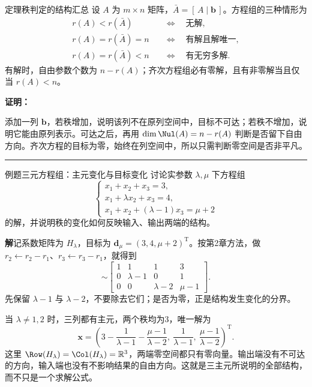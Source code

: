 \documentclass[a4paper,12pt,twoside,openany,fontset=none]{ctexbook}
\newcounter{theorem}[chapter]
\newenvironment{theorem}[1][]{\begin{thmBox}{定理}{#1}}{\end{thmBox}}
\newcounter{example}[chapter]
\newenvironment{example}[1][]{\begin{exBox}{例题}{#1}}{\end{exBox}}
\renewenvironment{proof}{
    \par\vspace{0.5em}\noindent
    \textbf{\color{LogicColor} 证明：}
}{
    \hfill \textcolor{LogicColor}{\rule{0.6em}{0.6em}} \par
}
\numberwithin{equation}{chapter}
\begin{document}
\begin{theorem}[秩判定的结构汇总]
设 $A$ 为 $m\times n$ 矩阵，$\bar A=[\,A\mid\boldsymbol b\,]$。方程组的三种情形为
\begin{align}
 r(A)<r(\bar A)&\quad\Longleftrightarrow\quad\text{无解},\\
 r(A)=r(\bar A)=n&\quad\Longleftrightarrow\quad\text{有解且解唯一},\\
 r(A)=r(\bar A)<n&\quad\Longleftrightarrow\quad\text{有无穷多解}.
\end{align}
有解时，自由参数个数为 $n-r(A)$；齐次方程组必有零解，且有非零解当且仅当 $r(A)<n$。
\end{theorem}
\begin{proof}
添加一列 $\boldsymbol b$，若秩增加，说明该列不在原列空间中，目标不可达；若秩不增加，说明它能由原列表示。可达之后，再用 $\dim\Nul(A)=n-r(A)$ 判断是否留下自由方向。齐次方程的目标为零，始终在列空间中，所以只需判断零空间是否非平凡。
\end{proof}

\begin{example}[三元方程组：主元变化与目标变化]
讨论实参数 $\lambda,\mu$ 下方程组
\begin{equation}
 \begin{cases}
 x_1+x_2+x_3=3,\\
 x_1+\lambda x_2+x_3=4,\\
 x_1+x_2+(\lambda-1)x_3=\mu+2
 \end{cases}
 \label{eq:five-two-parameter-system}
\end{equation}
的解，并说明秩的变化如何反映输入、输出两端的结构。
\end{example}
\textbf{解}\quad 记系数矩阵为 $H_\lambda$，目标为 $\boldsymbol d_\mu=(3,4,\mu+2)^{\mathrm T}$。按第2章方法，做 $r_2\leftarrow r_2-r_1$、$r_3\leftarrow r_3-r_1$，就得到
\begin{equation}
 [\,H_\lambda\mid\boldsymbol d_\mu\,]
 \sim\left[\begin{array}{rrr|r}
 1&1&1&3\\
 0&\lambda-1&0&1\\
 0&0&\lambda-2&\mu-1
 \end{array}\right].
 \label{eq:five-two-parameter-echelon}
\end{equation}
先保留 $\lambda-1$ 与 $\lambda-2$，不要除去它们；是否为零，正是结构发生变化的分界。

当 $\lambda\ne1,2$ 时，三列都有主元，两个秩均为3，唯一解为
\begin{equation}
 \boldsymbol x=
 \left(3-\frac1{\lambda-1}-\frac{\mu-1}{\lambda-2},\
       \frac1{\lambda-1},\ \frac{\mu-1}{\lambda-2}\right)^{\mathrm T}.
\end{equation}
这里 $\Row(H_\lambda)=\Col(H_\lambda)=\mathbb R^3$，两端零空间都只有零向量。输出端没有不可达的方向，输入端也没有不影响结果的自由方向。这就是三主元所说明的全部结构，而不只是一个求解公式。
\end{document}
